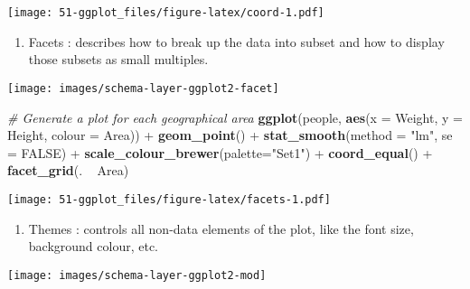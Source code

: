 \documentclass[]{book}
\newenvironment{Shaded}{\begin{snugshade}}{\end{snugshade}}
\newcommand{\KeywordTok}[1]{\textcolor[rgb]{0.13,0.29,0.53}{\textbf{{#1}}}}
\newcommand{\DataTypeTok}[1]{\textcolor[rgb]{0.13,0.29,0.53}{{#1}}}
\newcommand{\StringTok}[1]{\textcolor[rgb]{0.31,0.60,0.02}{{#1}}}
\newcommand{\CommentTok}[1]{\textcolor[rgb]{0.56,0.35,0.01}{\textit{{#1}}}}
\newcommand{\OtherTok}[1]{\textcolor[rgb]{0.56,0.35,0.01}{{#1}}}
\newcommand{\NormalTok}[1]{{#1}}
\providecommand{\tightlist}{%
  \setlength{\itemsep}{0pt}\setlength{\parskip}{0pt}}
\def\tightlist{}
\begin{document}
\texttt{[image: 51-ggplot\_files/figure-latex/coord-1.pdf]}

\begin{enumerate}
\def\labelenumi{\arabic{enumi}.}
\setcounter{enumi}{5}
\tightlist
\item
   {Facets} : describes how to break up the data into subset and how to
  display those subsets as small multiples.
\end{enumerate}

\texttt{[image: images/schema-layer-ggplot2-facet]}

\begin{Shaded}
\begin{Highlighting}[]
\CommentTok{# Generate a plot for each geographical area}
\KeywordTok{ggplot}\NormalTok{(people, }\KeywordTok{aes}\NormalTok{(}\DataTypeTok{x =} \NormalTok{Weight, }\DataTypeTok{y =} \NormalTok{Height, }\DataTypeTok{colour =} \NormalTok{Area)) +}
\StringTok{  }\KeywordTok{geom_point}\NormalTok{() +}
\StringTok{  }\KeywordTok{stat_smooth}\NormalTok{(}\DataTypeTok{method =} \StringTok{"lm"}\NormalTok{, }\DataTypeTok{se =} \OtherTok{FALSE}\NormalTok{) +}\StringTok{ }
\StringTok{  }\KeywordTok{scale_colour_brewer}\NormalTok{(}\DataTypeTok{palette=}\StringTok{"Set1"}\NormalTok{) +}
\StringTok{  }\KeywordTok{coord_equal}\NormalTok{() +}
\StringTok{  }\KeywordTok{facet_grid}\NormalTok{(. ~}\StringTok{ }\NormalTok{Area)}
\end{Highlighting}
\end{Shaded}

\texttt{[image: 51-ggplot\_files/figure-latex/facets-1.pdf]}

\begin{enumerate}
\def\labelenumi{\arabic{enumi}.}
\setcounter{enumi}{6}
\tightlist
\item
   {Themes} : controls all non-data elements of the plot, like the font
  size, background colour, etc.
\end{enumerate}

\texttt{[image: images/schema-layer-ggplot2-mod]}
\end{document}
